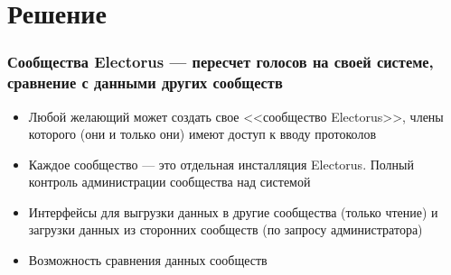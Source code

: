 \documentclass[compress,hyperref={linkcolor=blue,pdftex,unicode}]{beamer}
\begin{document}
\section*{Решение}
\begin{frame}
\frametitle{Сообщества Electorus --- пересчет голосов на своей системе, сравнение с данными других сообществ}
\begin{itemize}
\item Любой желающий может создать свое <<сообщество Electorus>>, члены которого (они и только они) имеют доступ к вводу протоколов
\item \alert{Каждое сообщество --- это отдельная инсталляция Electorus. Полный контроль администрации сообщества над системой}
\item Интерфейсы для выгрузки данных в другие сообщества (только чтение) и загрузки данных из сторонних сообществ (по запросу администратора)
\item Возможность сравнения данных сообществ
\end{itemize}
\end{frame}
\end{document}
